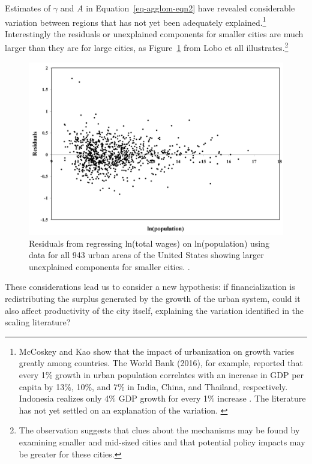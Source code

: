 Estimates \cite{mccoskeyPanelDataInvestigation, haryantotriRelationshipUrbanizationEducation2021, pugaMagnitudeCausesAgglomeration2010, loboUrbanScalingProduction2013} of  $\gamma$ and $A$ in Equation~\ref{eq-agglom-eqn2} have revealed considerable  variation between regions that has not yet been adequately explained.\footnote{McCoskey and Kao \cite{mccoskeyPanelDataInvestigation} show that the impact of urbanization on growth varies greatly among countries. The World Bank (2016), for example, reported that every 1\% growth in urban population correlates with an increase in GDP per capita by 13\%, 10\%, and 7\% in India, China, and Thailand, respectively. Indonesia realizes only 4\% GDP growth for every 1\% increase \cite{haryantotriRelationshipUrbanizationEducation2021}.  The literature has not yet settled on an explanation of the variation.  \cite{loboUrbanScalingProduction2013, pugaMagnitudeCausesAgglomeration2010} } 
Interestingly the residuals or unexplained components for smaller cities are much larger than they are for large cities, as Figure~\ref{fig-residuals-lobo} from Lobo et all \cite{loboUrbanScalingProduction2013} illustrates.\footnote{The observation suggests that clues about the mechanisms may be found by examining smaller and mid-sized cities and that potential policy impacts may be greater for these cities.} 
\begin{figure}[h!tb]
\centering
\includegraphics[scale=0.30]{fig/residuals-lobo.png}
\caption{Residuals from regressing ln(total wages) on ln(population) using data for all 943 urban areas of the United States showing larger unexplained components for smaller cities. \cite{loboUrbanScalingProduction2013}.}\label{fig-residuals-lobo}
\end{figure} 
These considerations lead us to consider a new hypothesis: if financialization is redistributing the surplus generated by the growth of the urban system, could it also affect  productivity of the city itself, explaining the variation identified in the scaling literature? 



